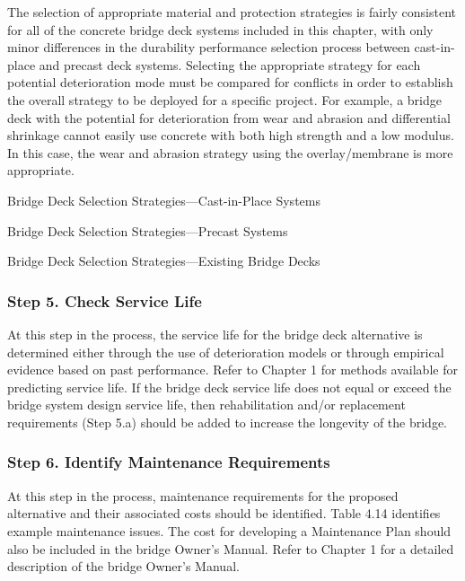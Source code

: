 The selection of appropriate material and protection strategies is fairly consistent for all of the concrete bridge
deck systems included in this chapter, with only minor differences in the durability performance selection process
between cast-in-place and precast deck systems. Selecting the appropriate strategy for each potential deterioration
mode must be compared for conflicts in order to establish the overall strategy to be deployed for a specific project.
For example, a bridge deck with the potential for deterioration from wear and abrasion and differential shrinkage cannot easily use concrete with both high strength and a low modulus. In this case, the wear and abrasion strategy
using the overlay/membrane is more appropriate.

\begin{table}
  \caption{Bridge Deck Selection Strategies—Cast-in-Place Systems}
  \label{tab:deck-select-stratergy-cip}
\end{table}

\begin{table}
  \caption{Bridge Deck Selection Strategies—Precast Systems}
  \label{tab:deck-select-stratergy-precast}
\end{table}

\begin{table}
  \caption{Bridge Deck Selection Strategies—Existing Bridge Decks}
  \label{tab:deck-select-stratergy-exist}
\end{table}


\subsubsection*{Step 5. Check Service Life}
At this step in the process, the service life for the bridge deck alternative is determined either through the use of
deterioration models or through empirical evidence based on past performance. Refer to Chapter 1 for methods
available for predicting service life. If the bridge deck service life does not equal or exceed the bridge system design
service life, then rehabilitation and/or replacement requirements (Step 5.a) should be added to increase the longevity
of the bridge.

\subsubsection*{Step 6. Identify Maintenance Requirements}
At this step in the process, maintenance requirements for the proposed alternative and their associated costs
should be identified. Table 4.14 identifies example maintenance issues. The cost for developing a Maintenance Plan
should also be included in the bridge Owner’s Manual. Refer to Chapter 1 for a detailed description of the bridge
Owner’s Manual.

